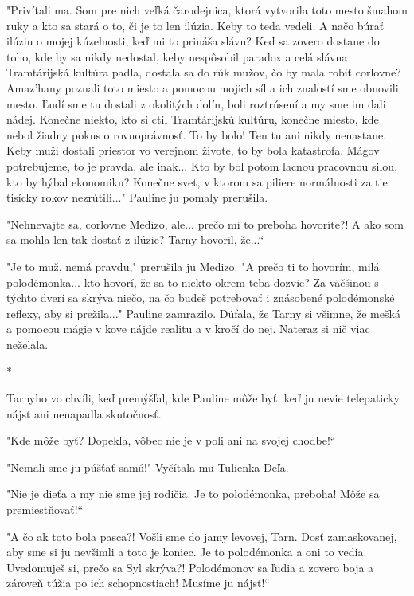 \documentclass{book}
\begin{document}
"$ $Privítali ma. Som pre nich veľká čarodejnica, ktorá vytvorila toto mesto šmahom ruky a kto sa stará o to, či je to len ilúzia. Keby to teda vedeli. A načo búrať ilúziu o mojej kúzelnosti, keď mi to prináša slávu? Keď sa zovero dostane do toho, kde by sa nikdy nedostal, keby nespôsobil paradox a celá slávna Tramtárijská kultúra padla, dostala sa do rúk mužov, čo by mala robiť corlovne? Amaz'hany poznali toto miesto a pomocou mojich síl a ich znalostí sme obnovili mesto. Ľudí sme tu dostali z okolitých dolín, boli roztrúsení a my sme im dali nádej. Konečne niekto, kto si ctil Tramtárijskú kultúru, konečne miesto, kde nebol žiadny pokus o rovnoprávnosť. To by bolo! Ten tu ani nikdy nenastane. Keby muži dostali priestor vo verejnom živote, to by bola katastrofa. Mágov potrebujeme, to je pravda, ale inak... Kto by bol potom lacnou pracovnou silou, kto by hýbal ekonomiku? Konečne svet, v ktorom sa piliere normálnosti za tie tisícky rokov nezrútili..."$ $ Pauline ju pomaly prerušila.

"$ $Nehnevajte sa, corlovne Medizo, ale... prečo mi to preboha hovoríte?! A ako som sa mohla len tak dostať z ilúzie? Tarny hovoril, že...“

"$ $Je to muž, nemá pravdu,"$ $ prerušila ju Medizo. "$ $A prečo ti to hovorím, milá polodémonka... kto hovorí, že sa to niekto okrem teba dozvie? Za väčšinou s týchto dverí sa skrýva niečo, na čo budeš potrebovať i znásobené polodémonské reflexy, aby si prežila..."$ $ Pauline zamrazilo. Dúfala, že Tarny si všimne, že mešká a pomocou mágie v kove nájde realitu a v kročí do nej. Nateraz si nič viac neželala.

\begin{center}
*
\end{center}

Tarnyho vo chvíli, keď premýšľal, kde Pauline môže byť, keď ju nevie telepaticky nájsť ani nenapadla skutočnosť.

"$ $Kde môže byť? Dopekla, vôbec nie je v poli ani na svojej chodbe!“

"$ $Nemali sme ju púšťať samú!"$ $ Vyčítala mu Tulienka Deľa.

"$ $Nie je dieťa a my nie sme jej rodičia. Je to polodémonka, preboha! Môže sa premiestňovať!“

"$ $A čo ak toto bola pasca?! Vošli sme do jamy levovej, Tarn. Dosť zamaskovanej, aby sme si ju nevšimli a toto je koniec. Je to polodémonka a oni to vedia. Uvedomuješ si, prečo sa Syl skrýva?! Polodémonov sa ľudia a zovero boja a zároveň túžia po ich schopnostiach! Musíme ju nájsť!“
\end{document}
